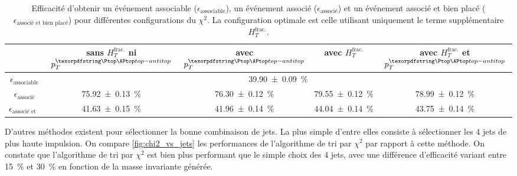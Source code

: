\begin{table}[h] \centering
    \begin{tabular}{@{}ccccc@{}} \toprule
        & sans $H_{T}^{\text{frac.}}$ ni $p_{T}^{\ttbar}$ & avec $p_{T}^{\ttbar}$ & avec $H_{T}^{\text{frac.}}$ & avec $H_{T}^{\text{frac.}}$ et $p_{T}^{\ttbar}$ \\ \midrule
        $\epsilon_\text{associable}$ & \multicolumn{4}{c}{\SI{39.90 \pm 0.09}{\%}} \\
        $\epsilon_\text{associé}$ & \SI{75.92 \pm 0.13}{\%} & \SI{76.30 \pm 0.12}{\%} & \SI{79.55 \pm 0.12}{\%} & \SI{78.99 \pm 0.12}{\%} \\
        $\epsilon_\text{associé et bien placé}$ & \SI{41.63 \pm 0.15}{\%} & \SI{41.96 \pm 0.14}{\%} & \SI{44.04 \pm 0.14}{\%} & \SI{43.75 \pm 0.14}{\%} \\ \bottomrule
    \end{tabular}
    \caption{Efficacité d'obtenir un événement associable ($\epsilon_\text{associable}$), un événement associé ($\epsilon_\text{associé}$) et un événement associé et bien placé ($\epsilon_\text{associé et bien placé}$) pour différentes configurations du $\chi^2$. La configuration optimale est celle utilisant uniquement le terme supplémentaire $H_{T}^{\text{frac.}}$.}
    \label{tab:chi2_study}
\end{table}

D'autres méthodes existent pour sélectionner la bonne combinaison de jets. La plus simple d'entre elles consiste à sélectionner les 4 jets de plus haute impulsion. On compare \cref{fig:chi2_vs_jets} les performances de l'algorithme de tri par $\chi^2$ par rapport à cette méthode. On constate que l'algorithme de tri par $\chi^2$ est bien plus performant que le simple choix des 4 jets, avec une différence d'efficacité variant entre \tilde\SI{15}{\%} et \tilde\SI{30}{\%} en fonction de la masse invariante \ttbar générée.


